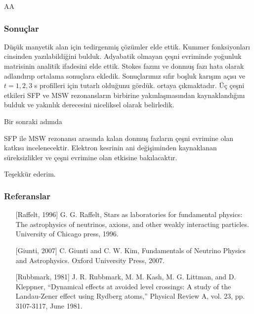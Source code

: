 \documentclass[10pt]{beamer}
\begin{document}
\begin{frame}
   AA
\end{frame}

\begin{frame}
    \frametitle{Sonuçlar}
    \scriptsize
    \begin{outline}
        \1[\textbullet] Düşük manyetik alan için {\color{red}tedirgenmiş çözümler} elde ettik.
         Kummer fonksiyonları cinsinden yazılabildiğini bulduk.
        \1[\textbullet] Adyabatik olmayan çeşni evriminde yoğunluk matrisinin analitik ifadesini elde ettik. Stokes fazını ve donmuş fazı hata olarak adlandırıp ortalama sonuçlara ekledik.
         Sonuçlarımız sıfır {\color{red}boşluk karışım açısı ve $ t=1,2,3 $ s} profilleri için tutarlı olduğunu gördük.
         ortaya çıkmaktadır. Üç çeşni etkileri SFP ve MSW rezonansların birbirine yakınlaşmasından kaynaklandığını bulduk ve yakınlık derecesini niceliksel olarak belirledik.
    \end{outline}
    
    Bir sonraki adımda 
    \begin{outline}
        \1[\textbullet] SFP ile MSW rezonansı arasında kalan donmuş fazların çeşni evrimine olan katkısı incelenecektir.
        \1[\textbullet] Elektron kesrinin ani değişiminden kaynaklanan süreksizlikler ve çeşni evrimine olan etkisine bakılacaktır.
    \end{outline}
    \normalsize
    
\end{frame}

\begin{frame}
    \huge
    \begin{center}
        Teşekkür ederim.
    \end{center}
\end{frame}

\begin{frame}
    \frametitle{Referanslar}
    \footnotesize
    \begin{itemize}
        \item[] [Raffelt, 1996] G. G. Raffelt, Stars as laboratories for fundamental physics: The astrophysics of neutrinos, axions, and other weakly interacting particles. University of Chicago press, 1996.        
        \item[] [Giunti, 2007] C. Giunti and C. W. Kim, Fundamentals of Neutrino Physics and Astrophysics. Oxford University Press, 2007.        
        \item[] [Rubbmark, 1981]  J. R. Rubbmark, M. M. Kash, M. G. Littman, and D. Kleppner, “Dynamical effects at avoided level crossings: A study of the Landau-Zener effect using Rydberg atoms,” Physical Review A, vol. 23, pp. 3107-3117, June 1981.
    \end{itemize}
    \normalsize
\end{frame}
\end{document}
